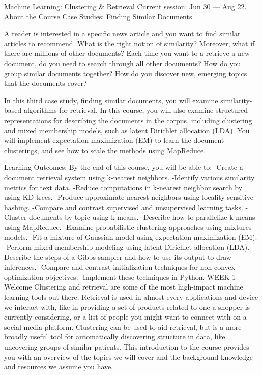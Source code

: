 Machine Learning: Clustering & Retrieval
Current session: Jun 30 — Aug 22.
About the Course
Case Studies: Finding Similar Documents

A reader is interested in a specific news article and you want to find similar articles to recommend.  What is the right notion of similarity?  Moreover, what if there are millions of other documents?  Each time you want to a retrieve a new document, do you need to search through all other documents?  How do you group similar documents together?  How do you discover new, emerging topics that the documents cover?   

In this third case study, finding similar documents, you will examine similarity-based algorithms for retrieval.  In this course, you will also examine structured representations for describing the documents in the corpus, including clustering and mixed membership models, such as latent Dirichlet allocation (LDA).  You will implement expectation maximization (EM) to learn the document clusterings, and see how to scale the methods using MapReduce.

Learning Outcomes:  By the end of this course, you will be able to:
   -Create a document retrieval system using k-nearest neighbors.
   -Identify various similarity metrics for text data.
   -Reduce computations in k-nearest neighbor search by using KD-trees.
   -Produce approximate nearest neighbors using locality sensitive hashing.
   -Compare and contrast supervised and unsupervised learning tasks.
   -Cluster documents by topic using k-means.
   -Describe how to parallelize k-means using MapReduce.
   -Examine probabilistic clustering approaches using mixtures models.
   -Fit a mixture of Gaussian model using expectation maximization (EM).
   -Perform mixed membership modeling using latent Dirichlet allocation (LDA).
   -Describe the steps of a Gibbs sampler and how to use its output to draw inferences.
   -Compare and contrast initialization techniques for non-convex optimization objectives.
   -Implement these techniques in Python.
WEEK 1
Welcome
Clustering and retrieval are some of the most high-impact machine learning tools out there. Retrieval is used in almost every applications and device we interact with, like in providing a set of products related to one a shopper is currently considering, or a list of people you might want to connect with on a social media platform. Clustering can be used to aid retrieval, but is a more broadly useful tool for automatically discovering structure in data, like uncovering groups of similar patients.
This introduction to the course provides you with an overview of the topics we will cover and the background knowledge and resources we assume you have.

